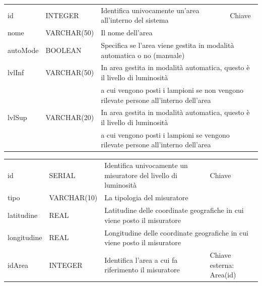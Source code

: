\begin{center}
    \begin{tabularx}{\textwidth}{|l|l|l|X|}
        \hline
        \rowcolor{gray!30}
        \multicolumn{4}{|c|}{\textbf{AREA}}\\
        \hline
        id & INTEGER & Identifica univocamente un'area all'interno del sistema & Chiave\\
        \hline
        nome & VARCHAR(50) & \multicolumn{2}{l|}{Il nome dell'area} \\
        \hline
        autoMode & BOOLEAN & \multicolumn{2}{l|}{Specifica se l'area viene gestita in modalità automatica o no (manuale)} \\
        \hline
        lvlInf & VARCHAR(50) & \multicolumn{2}{l|}{In area gestita in modalità automatica, questo è il livello di luminosità} \\ & & \multicolumn{2}{l|}{a cui vengono posti i lampioni se non vengono rilevate persone all'interno dell'area} \\
        \hline
        lvlSup & VARCHAR(20) & \multicolumn{2}{l|}{In area gestita in modalità automatica, questo è il livello di luminosità} \\ & & \multicolumn{2}{l|}{a cui vengono posti i lampioni se vengono rilevate persone all'interno dell'area} \\
        \hline
    \end{tabularx}
\end{center}

\begin{center}
    \begin{tabularx}{\textwidth}{|l|l|l|X|}
        \hline
        \rowcolor{gray!30}
        \multicolumn{4}{|c|}{\textbf{MISURATORE}}\\
        \hline
        id & SERIAL & Identifica univocamente un misuratore del livello di luminosità & Chiave\\
        \hline
        tipo & VARCHAR(10) & \multicolumn{2}{l|}{La tipologia del misuratore} \\
        \hline
        latitudine & REAL & \multicolumn{2}{l|}{Latitudine delle coordinate geografiche in cui viene posto il misuratore} \\
        \hline
        longitudine & REAL & \multicolumn{2}{l|}{Longitudine delle coordinate geografiche in cui viene posto il misuratore} \\
        \hline
        idArea & INTEGER & Identifica l'area a cui fa riferimento il misuratore & Chiave esterna: Area(id)\\
        \hline
    \end{tabularx}
\end{center}

